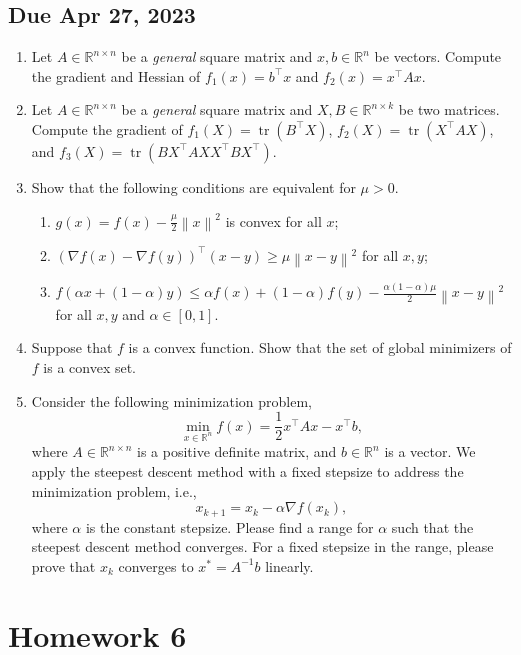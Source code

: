 \subsection*{Due Apr 27, 2023}
\begin{enumerate}[label=\textbf{Problem \arabic*.}]
    \item [10 pt] Let \(A\in\mathbb{R}^{n\times n}\) be a \textit{general} square matrix and \(x,b\in\mathbb{R}^{n}\) be vectors. Compute the gradient and Hessian of \(f_{1}(x)=b^{\top}x\) and \(f_{2}(x)=x^{\top}Ax\).
    \item [20 pt] Let \(A\in\mathbb{R}^{n\times n}\) be a \textit{general} square matrix and \(X,B\in\mathbb{R}^{n\times k}\) be two matrices. Compute the gradient of \(f_{1}(X)=\operatorname{tr}(B^{\top}X)\), \(f_{2}(X)=\operatorname{tr}(X^{\top}AX)\), and \(f_{3}(X)=\operatorname{tr}(BX^{\top}AXX^{\top}BX^{\top})\).
    \item [20 pt] Show that the following conditions are equivalent for \(\mu>0\).
    \begin{enumerate}
        \item \(g(x)=f(x)-\frac{\mu}{2}\left\|x\right\|^{2}\) is convex for all \(x\);
        \item \((\nabla f(x)-\nabla f(y))^{\top}\left(x-y\right)\geq\mu\left\|x-y\right\|^{2}\) for all \(x,y\);
        \item \(f(\alpha x+(1-\alpha)y)\leq\alpha f(x)+(1-\alpha)f(y)-\frac{\alpha(1-\alpha) \mu}{2}\left\|x-y\right\|^{2}\) for all \(x,y\) and \(\alpha\in[0,1]\).
    \end{enumerate}
    \item [10 pt] Suppose that \(f\) is a convex function. Show that the set of global minimizers of \(f\) is a convex set.
    \item [30 pt] Consider the following minimization problem,
    \[\min_{x\in\mathbb{R}^{n}}f(x)=\frac{1}{2}x^{\top}Ax-x^{\top}b,\]
    where \(A\in\mathbb{R}^{n\times n}\) is a positive definite matrix, and \(b\in\mathbb{R}^{n}\) is a vector. We apply the steepest descent method with a fixed stepsize to address the minimization problem, i.e.,
    \[x_{k+1}=x_{k}-\alpha\nabla f(x_{k}),\]
    where \(\alpha\) is the constant stepsize. Please find a range for \(\alpha\) such that the steepest descent method converges. For a fixed stepsize in the range, please prove that \(x_{k}\) converges to \(x^{*}=A^{-1}b\) linearly.
\end{enumerate}

\section{Homework 6}
